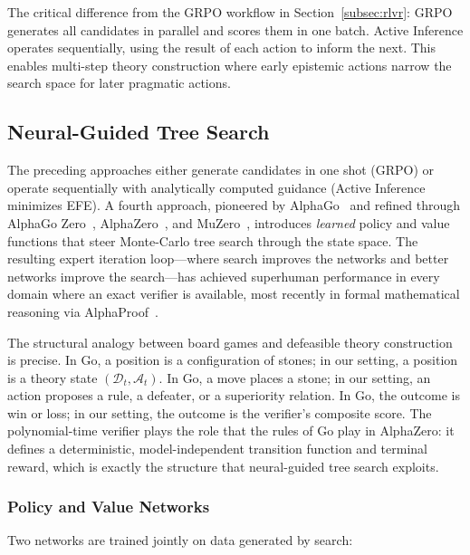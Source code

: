 \documentclass{article}
\theoremstyle{definition}
\newcommand{\D}{\mathcal{D}}
\begin{document}
The critical difference from the GRPO workflow in Section~\ref{subsec:rlvr}: GRPO generates all candidates in parallel and scores them in one batch. Active Inference operates sequentially, using the result of each action to inform the next. This enables multi-step theory construction where early epistemic actions narrow the search space for later pragmatic actions.


\subsection{Neural-Guided Tree Search}\label{subsec:neural_search}

The preceding approaches either generate candidates in one shot (GRPO) or operate sequentially with analytically computed guidance (Active Inference minimizes EFE). A fourth approach, pioneered by AlphaGo~\cite{silver2016alphago} and refined through AlphaGo Zero~\cite{silver2017alphagozero}, AlphaZero~\cite{silver2018alphazero}, and MuZero~\cite{schrittwieser2020muzero}, introduces \emph{learned} policy and value functions that steer Monte-Carlo tree search through the state space. The resulting expert iteration loop---where search improves the networks and better networks improve the search---has achieved superhuman performance in every domain where an exact verifier is available, most recently in formal mathematical reasoning via AlphaProof~\cite{alphaproof2025}.

The structural analogy between board games and defeasible theory construction is precise. In Go, a position is a configuration of stones; in our setting, a position is a theory state $(\D_t, \mathcal{A}_t)$. In Go, a move places a stone; in our setting, an action proposes a rule, a defeater, or a superiority relation. In Go, the outcome is win or loss; in our setting, the outcome is the verifier's composite score. The polynomial-time verifier plays the role that the rules of Go play in AlphaZero: it defines a deterministic, model-independent transition function and terminal reward, which is exactly the structure that neural-guided tree search exploits.

\subsubsection{Policy and Value Networks}

Two networks are trained jointly on data generated by search:
\end{document}
